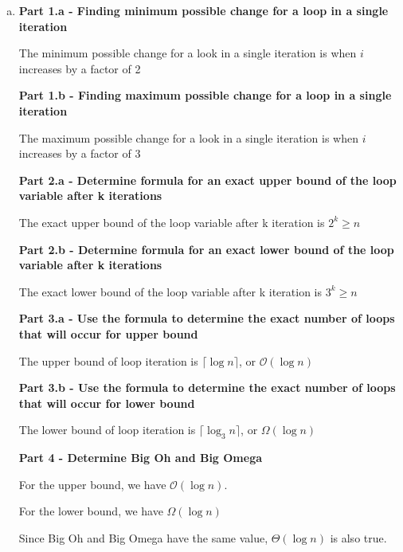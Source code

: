 \documentclass[12pt]{article}
\begin{document}
\begin{enumerate}[a.]
\begin{mdframed}
    \end{mdframed}

    \item

    \textbf{Part 1.a - Finding minimum possible change for a loop in a single iteration}

    \bigskip

    The minimum possible change for a look in a single iteration is when $i$
    increases by a factor of 2

    \bigskip

    \textbf{Part 1.b - Finding maximum possible change for a loop in a single iteration}

    \bigskip

    The maximum possible change for a look in a single iteration is when $i$
    increases by a factor of 3

    \bigskip

    \textbf{Part 2.a - Determine formula for an exact upper bound of the loop variable after k iterations}

    \bigskip

    The exact upper bound of the loop variable after k iteration is $2^k \geq n$

    \bigskip

    \textbf{Part 2.b - Determine formula for an exact lower bound of the loop variable after k iterations}

    \bigskip

    The exact lower bound of the loop variable after k iteration is $3^k \geq n$

    \bigskip

    \textbf{Part 3.a - Use the formula to determine the exact number of loops that will occur for upper bound}

    \bigskip

    The upper bound of loop iteration is $\lceil \log n \rceil$, or $\mathcal{O}(\log n)$

    \bigskip

    \textbf{Part 3.b - Use the formula to determine the exact number of loops that will occur for lower bound}

    \bigskip

    The lower bound of loop iteration is $\lceil \log_3 n \rceil$, or $\Omega(\log n)$

    \bigskip

    \textbf{Part 4 - Determine Big Oh and Big Omega}

    \bigskip

    For the upper bound, we have $\mathcal{O}(\log n)$.

    \bigskip

    For the lower bound, we have $\Omega(\log n)$

    \bigskip

    Since Big Oh and Big Omega have the same value, $\Theta (\log n)$ is also true.

\end{enumerate}
\end{document}
